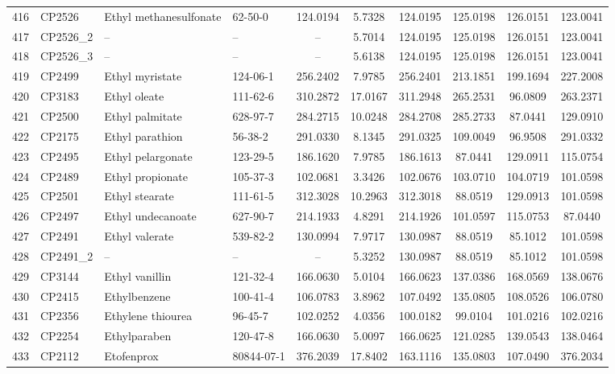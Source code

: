 \begin{longtable}{clllcccccc}
416 & CP2526 & Ethyl methanesulfonate & 62-50-0 & 124.0194 & 5.7328 & 124.0195 & 125.0198 & 126.0151 & 123.0041 \\ 
417 & CP2526\_2 & – & – & – & 5.7014 & 124.0195 & 125.0198 & 126.0151 & 123.0041 \\ 
418 & CP2526\_3 & – & – & – & 5.6138 & 124.0195 & 125.0198 & 126.0151 & 123.0041 \\ 
419 & CP2499 & Ethyl myristate & 124-06-1 & 256.2402 & 7.9785 & 256.2401 & 213.1851 & 199.1694 & 227.2008 \\ 
420 & CP3183 & Ethyl oleate & 111-62-6 & 310.2872 & 17.0167 & 311.2948 & 265.2531 & 96.0809 & 263.2371 \\ 
421 & CP2500 & Ethyl palmitate & 628-97-7 & 284.2715 & 10.0248 & 284.2708 & 285.2733 & 87.0441 & 129.0910 \\ 
422 & CP2175 & Ethyl parathion & 56-38-2 & 291.0330 & 8.1345 & 291.0325 & 109.0049 & 96.9508 & 291.0332 \\ 
423 & CP2495 & Ethyl pelargonate\smash{\textsuperscript{\textdagger}} & 123-29-5 & 186.1620 & 7.9785 & 186.1613 & 87.0441 & 129.0911 & 115.0754 \\ 
424 & CP2489 & Ethyl propionate & 105-37-3 & 102.0681 & 3.3426 & 102.0676 & 103.0710 & 104.0719 & 101.0598 \\ 
425 & CP2501 & Ethyl stearate\smash{\textsuperscript{\textdagger}} & 111-61-5 & 312.3028 & 10.2963 & 312.3018 & 88.0519 & 129.0913 & 101.0598 \\ 
426 & CP2497 & Ethyl undecanoate\smash{\textsuperscript{\textdagger}} & 627-90-7 & 214.1933 & 4.8291 & 214.1926 & 101.0597 & 115.0753 & 87.0440 \\ 
427 & CP2491 & Ethyl valerate & 539-82-2 & 130.0994 & 7.9717 & 130.0987 & 88.0519 & 85.1012 & 101.0598 \\ 
428 & CP2491\_2 & – & – & – & 5.3252 & 130.0987 & 88.0519 & 85.1012 & 101.0598 \\ 
429 & CP3144 & Ethyl vanillin & 121-32-4 & 166.0630 & 5.0104 & 166.0623 & 137.0386 & 168.0569 & 138.0676 \\ 
430 & CP2415 & Ethylbenzene & 100-41-4 & 106.0783 & 3.8962 & 107.0492 & 135.0805 & 108.0526 & 106.0780 \\ 
431 & CP2356 & Ethylene thiourea & 96-45-7 & 102.0252 & 4.0356 & 100.0182 & 99.0104 & 101.0216 & 102.0216 \\ 
432 & CP2254 & Ethylparaben & 120-47-8 & 166.0630 & 5.0097 & 166.0625 & 121.0285 & 139.0543 & 138.0464 \\ 
433 & CP2112 & Etofenprox & 80844-07-1 & 376.2039 & 17.8402 & 163.1116 & 135.0803 & 107.0490 & 376.2034 \\ 

\end{longtable}

